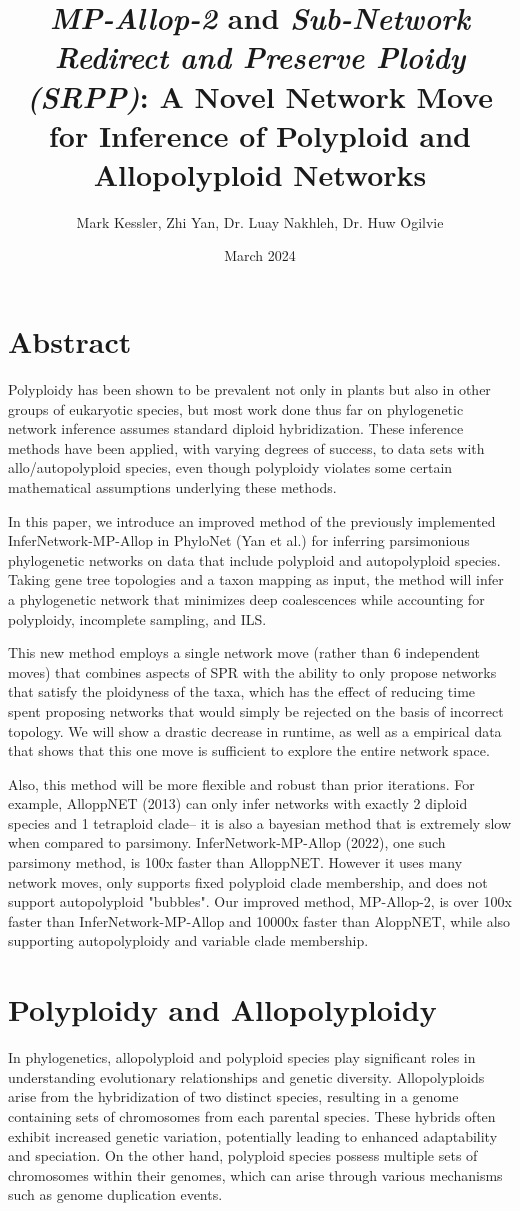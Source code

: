 \documentclass{article}
\title{\textit{MP-Allop-2} and  \textit{Sub-Network Redirect and Preserve Ploidy (SRPP)}: A Novel Network Move for Inference of Polyploid and Allopolyploid Networks}
\author{Mark Kessler, Zhi Yan, Dr. Luay Nakhleh, Dr. Huw Ogilvie}
\date{March 2024}
\begin{document}
\maketitle

\section{Abstract}
Polyploidy has been shown to be prevalent not only in plants but also in other groups of eukaryotic species, but 
most work done thus far on phylogenetic network inference assumes standard diploid hybridization. 
These inference methods have been applied, with varying degrees of success, to data sets with allo/autopolyploid species, 
even though polyploidy violates some certain mathematical assumptions underlying these methods. 
  
In this paper, we introduce an improved method of the previously implemented InferNetwork-MP-Allop in PhyloNet (Yan et al.) for inferring parsimonious phylogenetic networks on data that include polyploid 
and autopolyploid species. Taking gene tree topologies and a taxon mapping as input, the method will infer a phylogenetic network that minimizes deep coalescences while accounting for polyploidy, incomplete sampling, and ILS.
  
This new method employs a single network move (rather than 6 independent moves) that combines aspects of SPR with the ability to only propose networks that
satisfy the ploidyness of the taxa, which has the effect of reducing time spent proposing networks that would simply be rejected on the basis of incorrect topology.
We will show a drastic decrease in runtime, as well as a empirical data that shows that this one move is sufficient to explore the entire network space.

Also, this method will be more flexible and robust than prior iterations. For example, AlloppNET (2013) can only infer networks with exactly 2 diploid species and 1 tetraploid clade-- it is also a bayesian method that is extremely slow when compared to parsimony. InferNetwork-MP-Allop (2022), one such parsimony method, is 100x faster than AlloppNET. However it uses many network moves, only supports
fixed polyploid clade membership, and does not support autopolyploid "bubbles". Our improved method, MP-Allop-2, is over 100x faster than InferNetwork-MP-Allop and 10000x faster than AloppNET, while also supporting autopolyploidy and variable clade membership.

\section{Polyploidy and Allopolyploidy}
In phylogenetics, allopolyploid and polyploid species play significant roles in understanding evolutionary relationships and genetic diversity. Allopolyploids arise from the hybridization of two distinct species, resulting in a genome containing sets of chromosomes from each parental species. These hybrids often exhibit increased genetic variation, potentially leading to enhanced adaptability and speciation. On the other hand, polyploid species possess multiple sets of chromosomes within their genomes, which can arise through various mechanisms such as genome duplication events.
\end{document}
